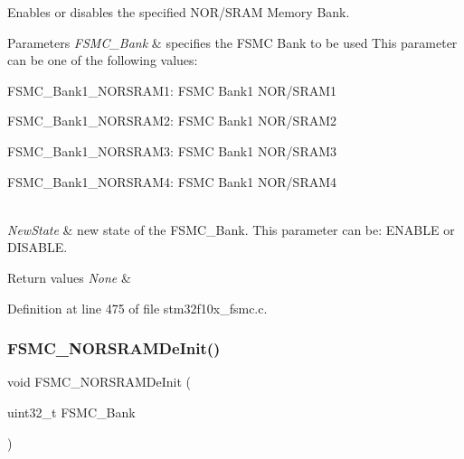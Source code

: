 Enables or disables the specified N\+O\+R/\+S\+R\+AM Memory Bank. 


\begin{DoxyParams}{Parameters}
{\em F\+S\+M\+C\+\_\+\+Bank} & specifies the F\+S\+MC Bank to be used This parameter can be one of the following values\+: \begin{DoxyItemize}
\item F\+S\+M\+C\+\_\+\+Bank1\+\_\+\+N\+O\+R\+S\+R\+A\+M1\+: F\+S\+MC Bank1 N\+O\+R/\+S\+R\+A\+M1 \item F\+S\+M\+C\+\_\+\+Bank1\+\_\+\+N\+O\+R\+S\+R\+A\+M2\+: F\+S\+MC Bank1 N\+O\+R/\+S\+R\+A\+M2 \item F\+S\+M\+C\+\_\+\+Bank1\+\_\+\+N\+O\+R\+S\+R\+A\+M3\+: F\+S\+MC Bank1 N\+O\+R/\+S\+R\+A\+M3 \item F\+S\+M\+C\+\_\+\+Bank1\+\_\+\+N\+O\+R\+S\+R\+A\+M4\+: F\+S\+MC Bank1 N\+O\+R/\+S\+R\+A\+M4 \end{DoxyItemize}
\\
\hline
{\em New\+State} & new state of the F\+S\+M\+C\+\_\+\+Bank. This parameter can be\+: E\+N\+A\+B\+LE or D\+I\+S\+A\+B\+LE. \\
\hline
\end{DoxyParams}

\begin{DoxyRetVals}{Return values}
{\em None} & \\
\hline
\end{DoxyRetVals}


Definition at line 475 of file stm32f10x\+\_\+fsmc.\+c.

\mbox{\label{group___f_s_m_c___private___functions_gaab3e6648e8a584e73785361ac960eded}} 
\subsubsection{\texorpdfstring{F\+S\+M\+C\+\_\+\+N\+O\+R\+S\+R\+A\+M\+De\+Init()}{FSMC\_NORSRAMDeInit()}}
{\footnotesize\ttfamily void F\+S\+M\+C\+\_\+\+N\+O\+R\+S\+R\+A\+M\+De\+Init (\begin{DoxyParamCaption}\item[{uint32\+\_\+t}]{F\+S\+M\+C\+\_\+\+Bank }\end{DoxyParamCaption})}




